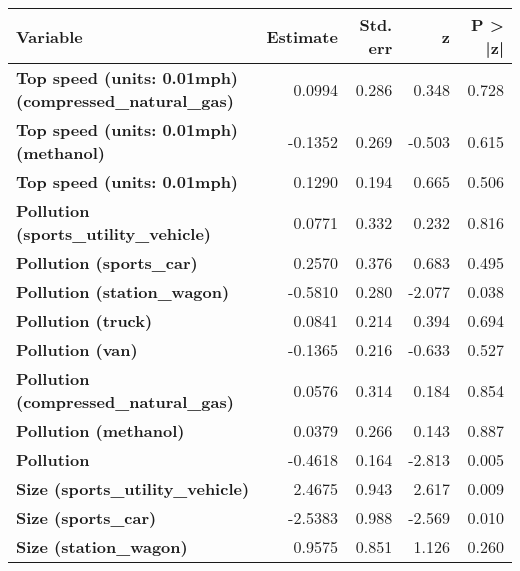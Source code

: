 \begin{tabular}{lrrrr}
\toprule
\textbf{Variable} & \textbf{Estimate} & \textbf{Std. err} & \textbf{z} & \textbf{P > |z| }  \\
\midrule

\textbf{Top speed (units: 0.01mph) (compressed\_natural\_gas)}   &       0.0994  &        0.286     &     0.348  &         0.728        \\
\textbf{Top speed (units: 0.01mph) (methanol)}                   &      -0.1352  &        0.269     &    -0.503  &         0.615        \\
\textbf{Top speed (units: 0.01mph)}                              &       0.1290  &        0.194     &     0.665  &         0.506        \\
\textbf{Pollution (sports\_utility\_vehicle)}                    &       0.0771  &        0.332     &     0.232  &         0.816        \\
\textbf{Pollution (sports\_car)}                                 &       0.2570  &        0.376     &     0.683  &         0.495        \\
\textbf{Pollution (station\_wagon)}                              &      -0.5810  &        0.280     &    -2.077  &         0.038        \\
\textbf{Pollution (truck)}                                       &       0.0841  &        0.214     &     0.394  &         0.694        \\
\textbf{Pollution (van)}                                         &      -0.1365  &        0.216     &    -0.633  &         0.527        \\
\textbf{Pollution (compressed\_natural\_gas)}                    &       0.0576  &        0.314     &     0.184  &         0.854        \\
\textbf{Pollution (methanol)}                                    &       0.0379  &        0.266     &     0.143  &         0.887        \\
\textbf{Pollution}                                               &      -0.4618  &        0.164     &    -2.813  &         0.005        \\
\textbf{Size (sports\_utility\_vehicle)}                         &       2.4675  &        0.943     &     2.617  &         0.009        \\
\textbf{Size (sports\_car)}                                      &      -2.5383  &        0.988     &    -2.569  &         0.010        \\
\textbf{Size (station\_wagon)}                                   &       0.9575  &        0.851     &     1.126  &         0.260        \\

\end{tabular}
